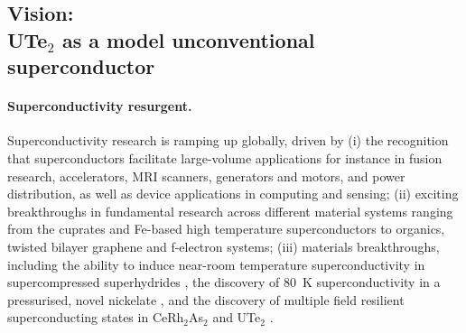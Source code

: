 \twocolumngrid


\subsection*{Vision: \\ UTe$_2$ as a model unconventional superconductor}
\noindent
\paragraph{Superconductivity resurgent.} Superconductivity research is ramping up globally, driven by (i) the recognition that superconductors facilitate large-volume applications for instance in fusion research, accelerators, MRI scanners, generators and motors, and power distribution, as well as device applications in computing and sensing; (ii) exciting breakthroughs in fundamental research across different material systems ranging from the cuprates and Fe-based high temperature superconductors to organics, twisted bilayer graphene and f-electron systems; (iii) materials breakthroughs, including the ability to induce near-room temperature superconductivity %
in supercompressed superhydrides \cite{drozdov19,somayazulu19}, the discovery of \SI{80}{\kelvin} superconductivity in a pressurised, novel nickelate \cite{sun23}, and the discovery of multiple field resilient superconducting states in CeRh$_2$As$_2$ \cite{khim21} and UTe$_2$ \cite{aoki19,ran19}. 



